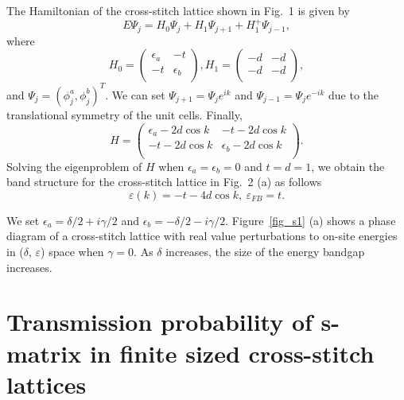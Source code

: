 \documentclass[report,epsfig,pre]{revtex4}
\begin{document}
The Hamiltonian of the cross-stitch lattice shown in Fig.~1 is given by
\begin{equation}
 E \Psi_j = H_0 \Psi_j + H_1 \Psi_{j+1} + H_1^+ \Psi_{j-1},
 \label{scheq}
\end{equation}
where
\begin{equation}
 H_0 = \left(\begin{array}{cc}
 \epsilon_a & -t \\
 -t & \epsilon_b \\
\end{array}\right),
 H_1 = \left(\begin{array}{cc}
 -d & -d \\
 -d & -d \\
\end{array}\right),
\label{cslattice}
\end{equation}
and $\Psi_j = (\phi_j^a, \phi_j^b)^T$.
We can set $\Psi_{j+1} = \Psi_j e^{ik}$ and $\Psi_{j-1} = \Psi_j e^{-ik}$ due to the translational symmetry of the unit cells. Finally,
\begin{equation}
H = \left(\begin{array}{cc}
 \epsilon_a - 2d \cos{k} & -t -2d \cos{k} \\
 -t -2d \cos{k} & \epsilon_b -2d \cos{k} \\
\end{array}\right).
\end{equation}
Solving the eigenproblem of $H$ when $\epsilon_a = \epsilon_b = 0$ and $t=d=1$, we obtain the band structure for the cross-stitch lattice in Fig.~2 (a) as follows
\begin{equation}
 \varepsilon(k)=-t-4 d \cos{k},   ~\varepsilon_{FB} = t.
\end{equation}

We set $\epsilon_a=\delta/2 + i \gamma/2$ and $\epsilon_b=-\delta/2 - i \gamma/2$.
Figure~\ref{fig_s1} (a) shows a phase diagram of a cross-stitch lattice with real value perturbations to on-site energies in ($\delta$, $\varepsilon$) space when $\gamma = 0$. As $\delta$ increases, the size of the energy bandgap increases.

\section{Transmission probability of s-matrix in finite sized cross-stitch lattices}
\end{document}
